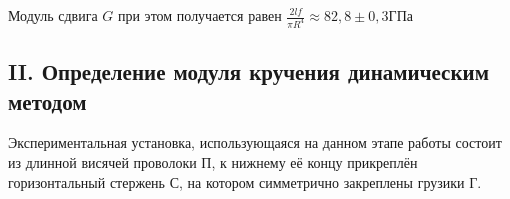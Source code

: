 \documentclass[a4paper, 12pt]{article}
\begin{document}
			\begin{figure}[h]
			\end{figure}
			
			Модуль сдвига $G$ при этом получается равен $\frac{2lf}{\pi R^4} \approx 82,8 \pm 0,3 ГПа$
		\subsection*{II. Определение модуля кручения динамическим методом}
			Экспериментальная установка, использующаяся на данном этапе работы состоит из длинной висячей проволоки П, к нижнему её концу прикреплён горизонтальный стержень С, на котором симметрично закреплены грузики Г.
			
\end{document}
